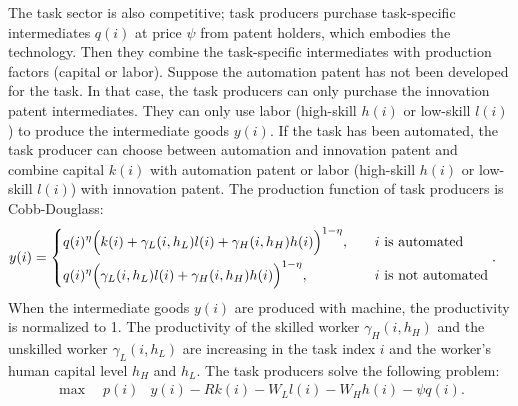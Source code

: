 \documentclass[12pt]{article}
\begin{document}
The task sector is also competitive; task producers purchase task-specific intermediates $q(i)$ at price $\psi$ from patent holders, which embodies the technology. Then they combine the task-specific intermediates with production factors (capital or labor). Suppose the automation patent has not been developed for the task. In that case, the task producers can only purchase the innovation patent intermediates. They can only use labor (high-skill $h(i)$ or low-skill $l(i)$) to produce the intermediate goods $y(i)$. If the task has been automated, the task producer can choose between automation and innovation patent and combine capital $k(i)$ with automation patent or labor (high-skill $h(i)$ or low-skill $l(i)$) with innovation patent. The production function of task producers is Cobb-Douglass:
\begin{align*}
y(i) &= 
\begin{dcases}
q(i)^{\eta}\Big(k(i) + \gamma_L(i,h_L)l(i)+\gamma_H(i,h_H)h(i)\Big)^{1-\eta} , &\quad \text{$i$ is automated}  \\
q(i)^{\eta}\Big(\gamma_L(i,h_L)l(i)+\gamma_H(i,h_H)h(i)\Big)^{1-\eta} ,&\quad \text{$i$ is not automated}
\end{dcases}. 
\end{align*}
When the intermediate goods $y(i)$ are produced with machine, the productivity is normalized to 1. The productivity of the skilled worker $\gamma_H(i,h_H)$ and the unskilled worker $\gamma_L(i,h_L)$ are increasing in the task index $i$ and the worker's human capital level $h_H$ and $h_L$. 
The task producers solve the following problem:
\begin{align*}
\max \quad  p(i)&y(i)-Rk(i)-W_Ll(i)-W_Hh(i)-\psi q(i).
\end{align*}
\end{document}
